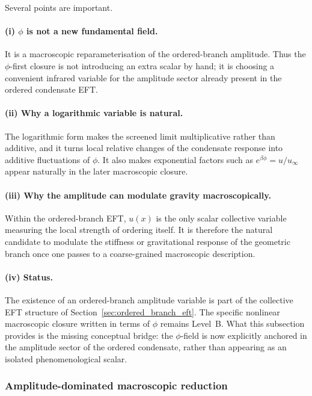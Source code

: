 \documentclass[11pt,a4paper]{article}
\numberwithin{equation}{section}
\begin{document}
Several points are important.

\paragraph{(i) $\phi$ is not a new fundamental field.}
It is a macroscopic reparameterisation of the ordered-branch amplitude.
Thus the $\phi$-first closure is not introducing an extra scalar by hand;
it is choosing a convenient infrared variable for the amplitude sector
already present in the ordered condensate EFT.

\paragraph{(ii) Why a logarithmic variable is natural.}
The logarithmic form makes the screened limit multiplicative rather than
additive, and it turns local relative changes of the condensate response
into additive fluctuations of $\phi$.
It also makes exponential factors such as
$e^{\beta\phi}=u/u_\infty$ appear naturally in the later macroscopic
closure.

\paragraph{(iii) Why the amplitude can modulate gravity macroscopically.}
Within the ordered-branch EFT, $u(x)$ is the only scalar collective
variable measuring the local strength of ordering itself.
It is therefore the natural candidate to modulate the stiffness or
gravitational response of the geometric branch once one passes to a
coarse-grained macroscopic description.

\paragraph{(iv) Status.}
The existence of an ordered-branch amplitude variable is part of the
collective EFT structure of Section~\ref{sec:ordered_branch_eft}.
The specific nonlinear macroscopic closure written in terms of $\phi$
remains Level~B.
What this subsection provides is the missing conceptual bridge:
the $\phi$-field is now explicitly anchored in the amplitude sector of
the ordered condensate, rather than appearing as an isolated
phenomenological scalar.

\subsubsection*{Amplitude-dominated macroscopic reduction}
\end{document}
